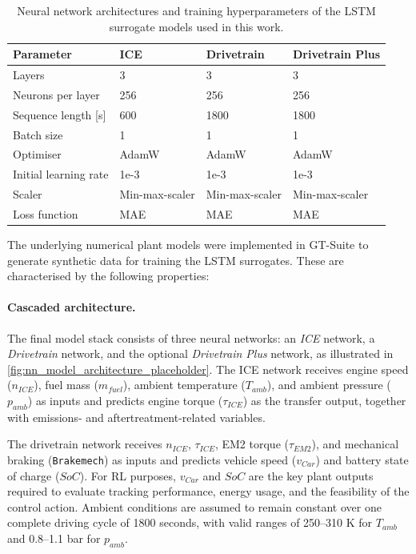\begin{table}[H]
  \centering
  \begin{tabular}{|l|l|l|l|}
    \hline
    \textbf{Parameter} & \textbf{ICE} & \textbf{Drivetrain} & \textbf{Drivetrain Plus} \\
    \hline
    Layers & 3 & 3 & 3 \\
    Neurons per layer & 256 & 256 & 256 \\
    Sequence length [s] & 600 & 1800 & 1800 \\
    Batch size & 1 & 1 & 1 \\
    Optimiser & AdamW & AdamW & AdamW \\
    Initial learning rate & 1e-3 & 1e-3 & 1e-3 \\
    Scaler & Min-max-scaler & Min-max-scaler & Min-max-scaler \\
    Loss function & MAE & MAE & MAE \\
    \hline
  \end{tabular}
  \caption[Surrogate LSTM architectures and hyperparameters]{Neural network architectures and training hyperparameters of the LSTM surrogate models used in this work.}
  \label{tab:lstm_model_architectures}
\end{table}

The underlying numerical plant models were implemented in GT-Suite \cite{gamma_technologies_gt-suite_nodate} to generate synthetic data for training the LSTM surrogates. These are characterised by the following properties:

\paragraph{Cascaded architecture.}
The final model stack consists of three neural networks: an \emph{ICE} network, a \emph{Drivetrain} network, and the optional \emph{Drivetrain Plus} network, as illustrated in \autoref{fig:nn_model_architecture_placeholder}. The ICE network receives engine speed ($n_{ICE}$), fuel mass ($m_{fuel}$), ambient temperature ($T_{amb}$), and ambient pressure ($p_{amb}$) as inputs and predicts engine torque ($\tau_{ICE}$) as the transfer output, together with emissions- and aftertreatment-related variables.

The drivetrain network receives $n_{ICE}$, $\tau_{ICE}$, EM2 torque ($\tau_{EM2}$), and mechanical braking (\texttt{Brakemech}) as inputs and predicts vehicle speed ($v_{Car}$) and battery state of charge ($SoC$). For RL purposes, $v_{Car}$ and $SoC$ are the key plant outputs required to evaluate tracking performance, energy usage, and the feasibility of the control action. Ambient conditions are assumed to remain constant over one complete driving cycle of 1800 seconds, with valid ranges of 250--310 K for $T_{amb}$ and 0.8--1.1 bar for $p_{amb}$.

